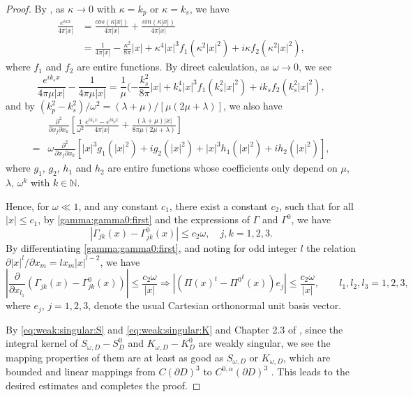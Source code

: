\documentclass[a4paper,11pt]{article}
\theoremstyle{remark}
\theoremstyle{definition}
\numberwithin{equation}{section}
\begin{document}
\begin{proof}
By \cite[Lemma 5.1]{PHhab}, as $\kappa\rightarrow 0$ with $\kappa = k_{p}$ or $\kappa = k_s$, we have
\begin{align*}
\frac{e^{i \kappa x}}{4\pi |x|}  &= \frac{cos(\kappa |x|)}{4 \pi |x|} + \frac{sin(\kappa |x|)}{4 \pi |x|} \\
 & = \frac{1}{4\pi |x|} - \frac{\kappa^2}{8\pi}|x| + \kappa^4|x|^3f_1(\kappa^2|x|^2) + i\kappa f_2(\kappa^2|x|^2),
\end{align*}
where $f_1$ and $f_2$ are entire functions. By direct calculation, as $\omega \rightarrow 0$, we see
\begin{equation}\label{gamma:gamma0:first}
\frac{e^{ik_sx}}{4\pi \mu |x|} - \frac{1}{4 \pi \mu |x|} = \frac{1}{\mu}(- \frac{k_s^2}{8\pi}|x| + k_s^4|x|^3f_1(k_s^2|x|^2) + ik_s f_2(k_s^2|x|^2),
\end{equation}
and by $(k_p^2-k_s^2)/\omega^2 = (\lambda+ \mu)/[\mu(2\mu + \lambda)]$, we also have
\begin{align}
 &\frac{\partial^2}{\partial x_j \partial x_k} \left[ \frac{1}{\omega^2}\frac{e^{ik_sx} -e^{ik_px}}{4 \pi |x|} + \frac{(\lambda+\mu)|x|}{8\pi \mu(2\mu + \lambda)}\right]\\
  = & \omega \frac{\partial^2}{\partial x_j \partial x_k}\left[ |x|^3g_{1}(|x|^2)+ig_{2}(|x|^2) +|x|^3h_{1}(|x|^2)+ih_{2}(|x|^2) \right], \label{gamma:gamma0:second}
\end{align}
where $g_1$, $g_2$, $h_1$ and $h_2$ are entire functions whose coefficients only depend on $\mu$, $\lambda$, $\omega^k$ with $k \in \mathbb{N}$.

Hence, for $\omega \ll 1$, and any constant $c_1$, there exist a constant $c_2$, such that for all $|x| \leq c_1$, by \eqref{gamma:gamma0:first} and the expressions of $\Gamma$ and $\Gamma^0$,  we have
\begin{equation}\label{eq:weak:singular:S}
|\Gamma_{jk}(x)-\Gamma_{jk}^0(x)| \leq c_2 \omega,  \quad j,k=1,2,3.
\end{equation}
By differentiating \eqref{gamma:gamma0:first}, and noting for odd integer $l$ the relation $\partial |x|^{l}/\partial x_m=lx_m|x|^{l-2}$, we have
\begin{equation}\label{eq:weak:singular:K}
|\frac{\partial}{\partial x_{l_1}}(\Gamma_{jk}(x)-\Gamma_{jk}^0(x))| \leq \frac{c_2\omega}{|x|} \Rightarrow |(\Pi(x)^{t}-{\Pi^0}^t(x))e_j| \leq \frac{c_2\omega}{|x|}, \quad \quad l_1, l_2, l_3=1,2,3,
\end{equation}
where $e_j$, $j=1,2,3$, denote the usual Cartesian orthonormal unit basis vector.

By \eqref{eq:weak:singular:S} and \eqref{eq:weak:singular:K} and Chapter 2.3 of \cite{CK0}, since the integral kernel of $S_{\omega, D} - S_{D}^{0}$ and $K_{\omega, D} - K_{D}^{0}$ are weakly singular, we see the mapping properties of them are at least as good as $S_{\omega, D}$ or $K_{\omega, D}$, which are bounded and linear mappings from $C(\partial D)^3$ to $C^{0,\alpha}(\partial D)^3$ . This leads to the desired estimates and completes the proof.
\end{proof}
\end{document}

